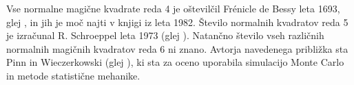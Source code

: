 \documentclass[a4paper,12pt]{article}
\theoremstyle{definition}
\theoremstyle{plain}
\begin{document}
Vse normalne magične kvadrate reda 4 je oštevilčil Frénicle de Bessy
leta 1693, glej \cite{bessy}, in jih je moč najti v knjigi \cite{berlekamp}
iz leta 1982. Število normalnih kvadratov reda 5 je izračunal
R. Schroeppel leta 1973 (glej \cite{gardner}).
Natančno število vseh različnih normalnih magičnih kvadratov reda 6 ni znano.
Avtorja navedenega približka sta Pinn in Wieczerkowski (glej \cite{pinn}), ki
sta za oceno uporabila simulacijo Monte Carlo in metode statistične mehanike.


\newpage



\end{document}
